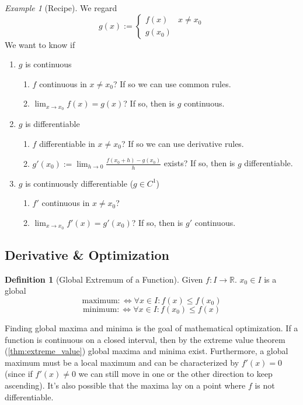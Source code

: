 \documentclass[english,titlepage]{uzhpub}
\theoremstyle{definition}
\newtheorem{definition}{Definition}[section]
\theoremstyle{plain}
\theoremstyle{remark}
\theoremstyle{example}
\newtheorem*{example}{Example}
\begin{document}
   \begin{example}[Recipe]
      We regard
      \[g(x) := \begin{cases}f(x) & x \neq x_0\\g(x_0)\end{cases}\]
      We want to know if
      \begin{enumerate}
         \item \(g\) is continuous
            \begin{enumerate}%
               \item \(f\) continuous in \(x \neq x_0\)? If so we can use common rules.
               \item \(\lim_{x \to x_0} f(x) = g(x)\)? If so, then is \(g\) continuous.
            \end{enumerate}
         \item \(g\) is differentiable
            \begin{enumerate}
               \item \(f\) differentiable in \(x \neq x_0\)? If so we can use derivative rules.
               \item \(g'(x_0) := \lim_{h \to 0} \frac{f(x_0 + h) - g(x_0)}{h}\) exists? If so, then is \(g\) differentiable.
            \end{enumerate}
         \item \(g\) is continuously differentiable (\(g \in C^1\))
            \begin{enumerate}
               \item \(f'\) continuous in \(x \neq x_0\)?
               \item \(\lim_{x \to x_0} f'(x) = g'(x_0)\)? If so, then is \(g'\) continuous.
            \end{enumerate}
      \end{enumerate}
   \end{example}

   \subsection{Derivative \& Optimization}
   \begin{definition}[Global Extremum of a Function]
      Given \(f: I \to \mathbb{R}\). \(x_0 \in I\) is a global
      \[\text{maximum} :\iff \forall x \in I: f(x) \leq f(x_0)\]
      \[\text{minimum} :\iff \forall x \in I: f(x_0) \leq f(x)\]
   \end{definition}

   Finding global maxima and minima is the goal of mathematical optimization.
   If a function is continuous on a closed interval, then by the extreme value theorem (\ref{thm:extreme_value}) global maxima and minima exist.
   Furthermore, a global maximum must be a local maximum and can be characterized by \(f'(x) = 0\) (since if \(f'(x) \neq 0\) we can still move in one or the other direction to keep ascending).
   It's also possible that the maxima lay on a point where \(f\) is not differentiable.
\end{document}
